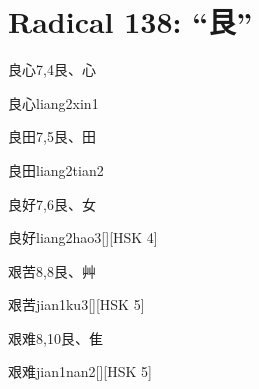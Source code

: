 
\section*{Radical 138: ``⾉''}

\begin{entry}{良心}{7,4}{⾉、⼼}
  \begin{phonetics}{良心}{liang2xin1}
  \end{phonetics}
\end{entry}

\begin{entry}{良田}{7,5}{⾉、⽥}
  \begin{phonetics}{良田}{liang2tian2}
  \end{phonetics}
\end{entry}

\begin{entry}{良好}{7,6}{⾉、⼥}
  \begin{phonetics}{良好}{liang2hao3}[][HSK 4]
  \end{phonetics}
\end{entry}

\begin{entry}{艰苦}{8,8}{⾉、⾋}
  \begin{phonetics}{艰苦}{jian1ku3}[][HSK 5]
  \end{phonetics}
\end{entry}

\begin{entry}{艰难}{8,10}{⾉、⾫}
  \begin{phonetics}{艰难}{jian1nan2}[][HSK 5]
  \end{phonetics}
\end{entry}


